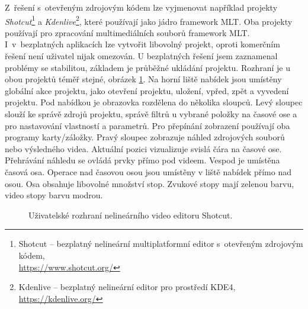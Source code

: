 Z~řešení s~otevřeným zdrojovým kódem lze vyjmenovat například projekty \textit{Shotcut}\footnote{Shotcut -- bezplatný nelineární multiplatformní editor s~otevřeným zdrojovým kódem,\\\url{https://www.shotcut.org/}} a \textit{Kdenlive}\footnote{Kdenlive -- bezplatný nelineární editor pro prostředí KDE4, \url{https://kdenlive.org/}}, které používají jako jádro framework MLT. Oba projekty používají pro zpracování multimediálních souborů framework MLT. I~v~bezplatných aplikacích lze vytvořit libovolný projekt, oproti komerčním řešení není uživatel nijak omezován. U bezplatných řešení jsem zaznamenal problémy se stabilitou, základem je průběžné ukládání projektu. Rozhraní je u obou projektů téměř stejné, obrázek \ref{img:shotcut}. Na horní liště nabídek jsou umístěny globální akce projektu, jako otevření projektu, uložení, vpřed, zpět a vyvedení projektu. Pod nabídkou je obrazovka rozdělena do několika sloupců. Levý sloupec slouží ke správě zdrojů projektu, správě filtrů u vybrané položky na časové ose a pro nastavování vlastností a parametrů. Pro přepínání zobrazení používají oba programy karty/záložky. Pravý sloupec zobrazuje náhled zdrojových souborů nebo výsledného videa. Aktuální pozici vizualizuje svislá čára na časové ose. Přehrávání náhledu se ovládá prvky přímo pod videem. Vespod je umístěna časová osa. Operace nad časovou osou jsou umístěny v liště nabídek přímo nad osou. Osa obsahuje libovolné množství stop. Zvukové stopy mají zelenou barvu, video stopy barvu modrou.
\begin{figure}[h]
	\centering
	\caption{Uživatelské rozhraní nelineárního video editoru Shotcut.}\label{img:shotcut}
\end{figure}


